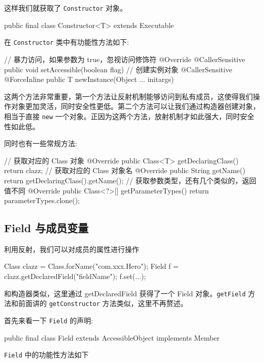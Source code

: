 这样我们就获取了 \texttt{Constructor} 对象。
\begin{Java}
public final class Constructor<T> extends Executable
\end{Java}

在 \texttt{Constructor} 类中有功能性方法如下:

\begin{Java}
// 暴力访问，如果参数为 true，忽视访问修饰符
@Override
@CallerSensitive
public void setAccessible(boolean flag)
// 创建实例对象
@CallerSensitive
@ForceInline
public T newInstance(Object ... initargs)
\end{Java}

这两个方法非常重要，第一个方法让反射机制能够访问到私有成员，这使得我们操作对象更加灵活，同时安全性更低。第二个方法可以让我们通过构造器创建对象，相当于直接 \texttt{new} 一个对象。正因为这两个方法，放射机制才如此强大，同时安全性如此低。

同时也有一些常规方法:

\begin{Java}
// 获取对应的 Class 对象
@Override
public Class<T> getDeclaringClass() {
    return clazz;
}
// 获取对应的 Class 对象名
@Override
public String getName() {
    return getDeclaringClass().getName();
}
// 获取参数类型，还有几个类似的，返回值不同
@Override
public Class<?>[] getParameterTypes() {
    return parameterTypes.clone();
}
\end{Java}

\subsection{Field 与成员变量}

利用反射，我们可以对成员的属性进行操作

\begin{Java}
Class clazz = Class.forName("com.xxx.Hero");
Field f = clazz.getDeclaredField("fieldName");
f.set(...);
\end{Java}

和构造器类似，这里通过 getDeclaredField 获得了一个 Field 对象。\texttt{getField} 方法和前面讲的 \texttt{getConstructor} 方法类似，这里不再赘述。

首先来看一下 \texttt{Field} 的声明:

\begin{Java}
public final class Field extends AccessibleObject implements Member
\end{Java}

\texttt{Field} 中的功能性方法如下

